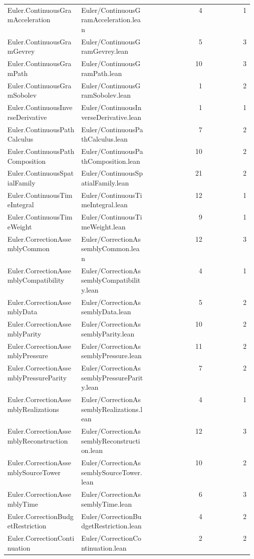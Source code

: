 \begin{longtable}{p{0.30\linewidth}p{0.28\linewidth}rr}
Euler.ContinuousGramAcceleration & Euler/ContinuousGramAcceleration.lean & 4 & 1\\
Euler.ContinuousGramGevrey & Euler/ContinuousGramGevrey.lean & 5 & 3\\
Euler.ContinuousGramPath & Euler/ContinuousGramPath.lean & 10 & 3\\
Euler.ContinuousGramSobolev & Euler/ContinuousGramSobolev.lean & 1 & 2\\
Euler.ContinuousInverseDerivative & Euler/ContinuousInverseDerivative.lean & 1 & 1\\
Euler.ContinuousPathCalculus & Euler/ContinuousPathCalculus.lean & 7 & 2\\
Euler.ContinuousPathComposition & Euler/ContinuousPathComposition.lean & 10 & 2\\
Euler.ContinuousSpatialFamily & Euler/ContinuousSpatialFamily.lean & 21 & 2\\
Euler.ContinuousTimeIntegral & Euler/ContinuousTimeIntegral.lean & 12 & 1\\
Euler.ContinuousTimeWeight & Euler/ContinuousTimeWeight.lean & 9 & 1\\
Euler.CorrectionAssemblyCommon & Euler/CorrectionAssemblyCommon.lean & 12 & 3\\
Euler.CorrectionAssemblyCompatibility & Euler/CorrectionAssemblyCompatibility.lean & 4 & 1\\
Euler.CorrectionAssemblyData & Euler/CorrectionAssemblyData.lean & 5 & 2\\
Euler.CorrectionAssemblyParity & Euler/CorrectionAssemblyParity.lean & 10 & 2\\
Euler.CorrectionAssemblyPressure & Euler/CorrectionAssemblyPressure.lean & 11 & 2\\
Euler.CorrectionAssemblyPressureParity & Euler/CorrectionAssemblyPressureParity.lean & 7 & 2\\
Euler.CorrectionAssemblyRealizations & Euler/CorrectionAssemblyRealizations.lean & 4 & 1\\
Euler.CorrectionAssemblyReconstruction & Euler/CorrectionAssemblyReconstruction.lean & 12 & 3\\
Euler.CorrectionAssemblySourceTower & Euler/CorrectionAssemblySourceTower.lean & 10 & 2\\
Euler.CorrectionAssemblyTime & Euler/CorrectionAssemblyTime.lean & 6 & 3\\
Euler.CorrectionBudgetRestriction & Euler/CorrectionBudgetRestriction.lean & 4 & 2\\
Euler.CorrectionContinuation & Euler/CorrectionContinuation.lean & 2 & 2\\

\end{longtable}
